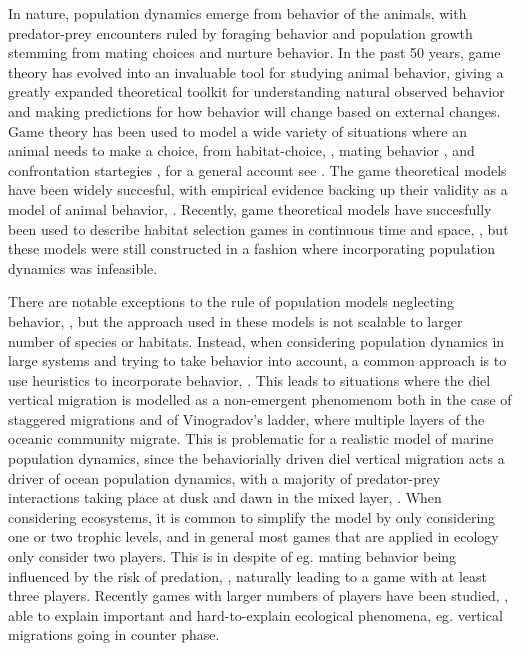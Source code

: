 In nature, population dynamics emerge from behavior of the animals, with predator-prey encounters ruled by foraging behavior and population growth stemming from mating choices and nurture   behavior. In the past 50 years, game theory has evolved into an invaluable tool for studying animal behavior, giving a greatly expanded theoretical toolkit for understanding natural observed behavior and making predictions for how behavior will change based on external changes. Game theory has been used to model a wide variety of situations where an animal needs to make a choice, from habitat-choice, \citep{krivan1997dynamic}, mating behavior  \citep{rapoport1967exploiter}, and confrontation startegies \citep{smith1973logic}, for a general account see \citep{broom2013game}. The game theoretical models have been widely succesful, with empirical evidence backing up their validity as a model of animal behavior, \citep{cooper1989communication,empirical_trait,behaviorial_effects}. Recently, game theoretical models have succesfully been used to describe habitat selection games in continuous time and space, \citep{jerome,verticalmigration}, but these models were still constructed in a fashion where incorporating population dynamics was infeasible.

 There are notable exceptions to the rule of population models neglecting behavior, \citep{Krivan1998,genkai2007macrophyte, sadowski2019predator, cressman2010ideal,}, but the approach used in these models is not scalable to larger number of species or habitats. Instead, when considering population dynamics in large systems and trying to take behavior into account, a common approach is to use heuristics to incorporate behavior, \citep{ho2019predation}. This leads to situations where the diel vertical migration is modelled as a non-emergent phenomenom \citep{van2018global} 
both in the case of staggered migrations and of  Vinogradov's ladder, where multiple layers of the oceanic community migrate. This is problematic for a realistic model of marine population dynamics, since the behaviorially driven diel vertical migration acts a driver of ocean population dynamics, with a majority of predator-prey interactions taking place at dusk and dawn in the mixed layer,  \citep{benoit2014critical}. When considering ecosystems, it is common to simplify the model by only considering one or two trophic levels, and in general most games that are applied in ecology only consider two players. This is in despite of eg. mating behavior being influenced by the risk of predation, \citep{carranza1999red,lima2009predators}, naturally leading to a game with at least three players. Recently games with larger numbers of players have been studied, \citep{pinti2019trophic}, able to explain important and hard-to-explain ecological phenomena, eg. vertical migrations going in counter phase.

